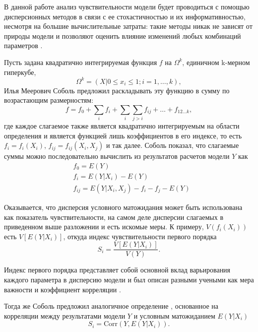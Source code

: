 \documentclass[a4paper,12pt]{article} %
\begin{document}
В данной работе анализ чувствительности модели будет проводиться с помощью дисперсионных методов в связи с ее стохастичностью и их информативностью, несмотря на большие вычислительные затраты: такие методы никак не зависят от природы модели и позволяют оценить влияние изменений любых комбинаций параметров \cite{saltelli2008global}.

Пусть задана квадратично интегрируемая функция $f$ на $\Omega^k$, единичном k-мерном гиперкубе,
\begin{displaymath}
\Omega^k=(X|0\leq x_i \leq 1;i=1,\ldots ,k),
\end{displaymath}
Илья Меерович Соболь предложил раскладывать эту функцию в сумму по возрастающим размерностям:
\begin{displaymath}
f=f_0+\sum\limits_i f_i + \sum\limits_i \sum\limits_{j>i} f_{ij}+\ldots+f_{12\ldots k},
\end{displaymath}
где каждое слагаемое также является квадратично интегрируемым на области определения и является функцией лишь коэффициентов в его индексе, то есть $f_i=f_i(X_i)$, $f_{ij}=f_{ij}(X_i,X_j)$ и так далее. Соболь показал, что слагаемые суммы можно последовательно вычислить из результатов расчетов модели $Y$ как
\begin{align*}
&f_0=E(Y) \\
&f_i=E(Y|X_i)-E(Y) \\
&f_{ij} = E(Y|X_i,X_j)-f_i-f_j-E(Y)
\end{align*}

Оказывается, что дисперсия условного матожидания может быть использована как показатель чувствительности, на самом деле дисперсии слагаемых в приведенном выше разложении и есть искомые меры. К примеру, $V(f_i(X_i))$ есть $V[E(Y|X_i)]$, откуда индекс чувствительности первого порядка 
\begin{displaymath}
S_i=\frac{V[E(Y|X_i)]}{V(Y)}.
\end{displaymath}

Индекс первого порядка представляет собой основной вклад варьирования каждого параметра в дисперсию модели и был описан разными учеными как мера важности \cite{hora1986comparison, ishigami1990importance, iman1990robust, saltelli1993sensitivity, homma1996importance} и коэффициент корреляции \cite{mckay1996variance}.

Тогда же Соболь предложил аналогичное определение \cite{sobol1996freezing}, основанное на корреляции между результатами модели $Y$ и условным матожиданием $E(Y|X_i)$
\begin{displaymath}
S_i=\text{Corr}(Y,E(Y|X_i)).
\end{displaymath}
\end{document}
